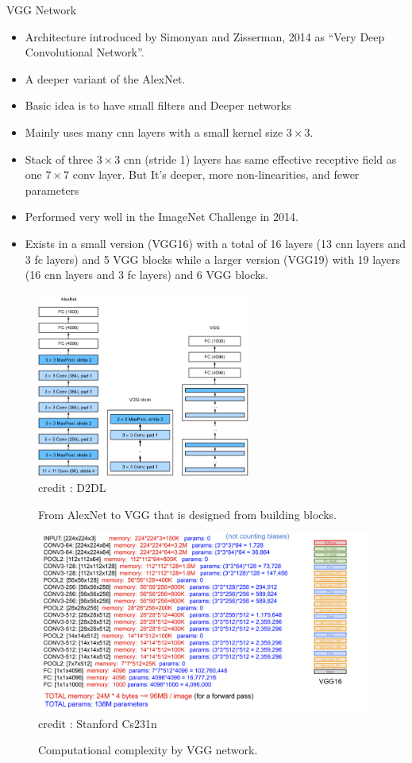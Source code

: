 \begin{vbframe}{VGG Network}
  \begin{itemize}
    \item Architecture introduced by Simonyan and Zisserman, 2014 as \enquote{Very Deep Convolutional Network}.
    \item A deeper variant of the AlexNet.
    \item Basic idea is to have small filters and Deeper networks
    \item Mainly uses many cnn layers with a small kernel size $3 \times 3$.
    \item Stack of three $3 \times 3$ cnn (stride 1) layers has same effective receptive field as one $7 \times 7$ conv layer. But It's deeper, more non-linearities, and fewer parameters
    \item Performed very well in the ImageNet Challenge in 2014.
    \item Exists in a small version (VGG16) with a total of 16 layers (13 cnn layers and 3 fc layers) and 5 VGG blocks while a larger version (VGG19) with 19 layers (16 cnn layers and 3 fc layers) and 6 VGG blocks.
  \end{itemize}
  
\framebreak

  \begin{figure}
  \centering
    \includegraphics[width=7cm]{plots/moderncnn/vgg.png}
    \tiny{\\ credit : D2DL}
    \caption{From AlexNet to VGG that is designed from building blocks.}
  \end{figure}
  
          \begin{figure}
        \centering
        \includegraphics[width=11cm]{plots/moderncnn/VGG_detail.png}
                    \tiny{\\ credit : Stanford Cs231n}
        \caption{Computational complexity by VGG network.}
    \end{figure}

\end{vbframe}


